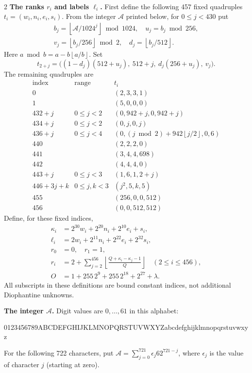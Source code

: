 \documentclass[10pt]{article}
\let\bigsum\sum
\renewcommand{\sum}{\bigsum\nolimits}
\newcommand{\fl}[1]{\left\lfloor #1\right\rfloor}
\begin{document}
\begin{multicols}{2}
\textbf{The ranks $r_i$ and labels $\ell_i$.}
First define the following 457 fixed quadruples
$t_i=(w_i,n_i,e_i,s_i)$.
From the integer $\mathcal A$ printed below, for $0\le j<430$ put
\[
\begin{gathered}
b_j=\fl{\mathcal A/1024^j}\bmod1024,\quad u_j=b_j\bmod256,\\
v_j=\fl{b_j/256}\bmod2,\quad d_j=\fl{b_j/512}.
\end{gathered}
\]
Here $a\bmod b=a-b\fl{a/b}$. Set
\[
t_{2+j}=\bigl((1-d_j)(512+u_j),\ 512+j,\ d_j(256+u_j),\ v_j\bigr).
\]
The remaining quadruples are
\[
\begin{array}{c|c|l}
\text{index}&\text{range}&t_i\\\hline
0&& (2,3,3,1)\\
1&& (5,0,0,0)\\
432+j&0\le j<2&(0,942+j,0,942+j)\\
434+j&0\le j<2&(0,j,0,j)\\
436+j&0\le j<4&(0,(j\bmod2)+942\fl{j/2},0,6)\\
440&&(2,2,2,0)\\
441&&(3,4,4,698)\\
442&&(4,4,4,0)\\
443+j&0\le j<3&(1,6,1,2+j)\\
446+3j+k&0\le j,k<3&(j^2,5,k,5)\\
455&&(256,0,0,512)\\
456&&(0,0,512,512)
\end{array}
\]
Define, for these fixed indices,
\begin{align*}
\kappa_i&=2^{30}w_i+2^{20}n_i+2^{10}e_i+s_i,\\
\ell_i&=2w_i+2^{11}n_i+2^{22}e_i+2^{32}s_i,\\
r_0&=0,\quad r_1=1,\\
r_i&=2+\sum_{j=2}^{456}\fl{\frac{Q+\kappa_i-\kappa_j-1}{Q}}
 \quad(2\le i\le456),\\
O&=1+255\,2^9+255\,2^{18}+2^{27}+\lambda.
\end{align*}
All subscripts in these definitions are bound constant indices, not
additional Diophantine unknowns.

\textbf{The integer $\mathcal A$.} Digit values are $0,\ldots,61$ in this alphabet:
{\fontsize{8}{9.1}\selectfont\ttfamily
0123456789ABCDEFGHIJKLMNOPQRSTUVWXYZabcdefghijklmnopqrstuvwxyz\par}
For the following 722 characters, put
$\mathcal A=\sum_{j=0}^{721}\epsilon_j62^{721-j}$,
where $\epsilon_j$ is the value of character $j$ (starting at zero).


\end{multicols}
\end{document}
